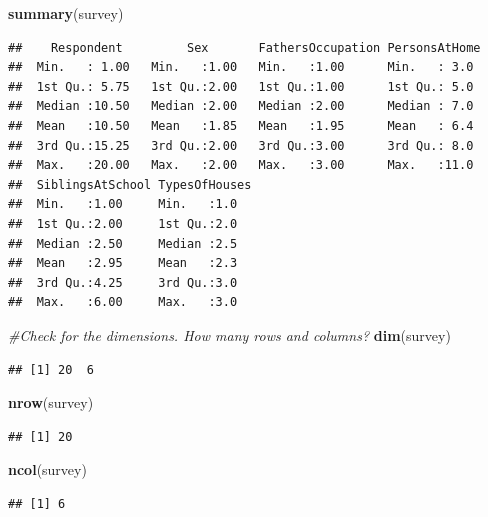 \documentclass[
]{article}
\newenvironment{Shaded}{\begin{snugshade}}{\end{snugshade}}
\newcommand{\CommentTok}[1]{\textcolor[rgb]{0.56,0.35,0.01}{\textit{#1}}}
\newcommand{\FunctionTok}[1]{\textcolor[rgb]{0.13,0.29,0.53}{\textbf{#1}}}
\newcommand{\NormalTok}[1]{#1}
\begin{document}
\begin{Shaded}
\begin{Highlighting}[]
\FunctionTok{summary}\NormalTok{(survey)}
\end{Highlighting}
\end{Shaded}

\begin{verbatim}
##    Respondent         Sex       FathersOccupation PersonsAtHome 
##  Min.   : 1.00   Min.   :1.00   Min.   :1.00      Min.   : 3.0  
##  1st Qu.: 5.75   1st Qu.:2.00   1st Qu.:1.00      1st Qu.: 5.0  
##  Median :10.50   Median :2.00   Median :2.00      Median : 7.0  
##  Mean   :10.50   Mean   :1.85   Mean   :1.95      Mean   : 6.4  
##  3rd Qu.:15.25   3rd Qu.:2.00   3rd Qu.:3.00      3rd Qu.: 8.0  
##  Max.   :20.00   Max.   :2.00   Max.   :3.00      Max.   :11.0  
##  SiblingsAtSchool TypesOfHouses
##  Min.   :1.00     Min.   :1.0  
##  1st Qu.:2.00     1st Qu.:2.0  
##  Median :2.50     Median :2.5  
##  Mean   :2.95     Mean   :2.3  
##  3rd Qu.:4.25     3rd Qu.:3.0  
##  Max.   :6.00     Max.   :3.0
\end{verbatim}

\begin{Shaded}
\begin{Highlighting}[]
\CommentTok{\#Check for the dimensions. How many rows and columns?}
\FunctionTok{dim}\NormalTok{(survey)}
\end{Highlighting}
\end{Shaded}

\begin{verbatim}
## [1] 20  6
\end{verbatim}

\begin{Shaded}
\begin{Highlighting}[]
\FunctionTok{nrow}\NormalTok{(survey)}
\end{Highlighting}
\end{Shaded}

\begin{verbatim}
## [1] 20
\end{verbatim}

\begin{Shaded}
\begin{Highlighting}[]
\FunctionTok{ncol}\NormalTok{(survey)}
\end{Highlighting}
\end{Shaded}

\begin{verbatim}
## [1] 6
\end{verbatim}
\end{document}
